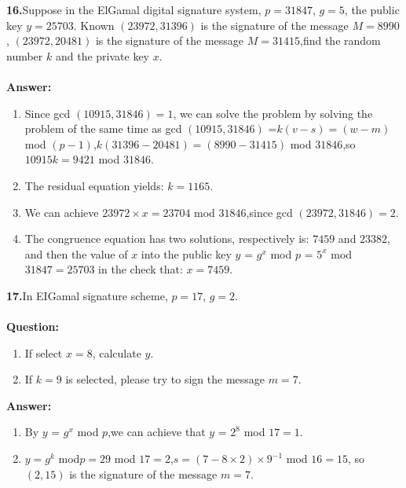\documentclass[paper=a4, fontsize=11pt]{scrartcl} %
\numberwithin{equation}{section} %
\numberwithin{figure}{section} %
\numberwithin{table}{section} %
\begin{document}
\textbf{16.}Suppose in the ElGamal digital signature system, $p = 31847$, $g = 5$, the public key $y = 25703$. Known $(23972,31396)$ is the signature of the message $M=8990$, $(23972,20481)$ is the signature of the message $M = 31415$,find the random number $k$ and the private key $x$.
\\
\\
\textbf{Answer:}
\begin{enumerate}
\item Since gcd $(10915, 31846) = 1$, we can solve the problem by solving the problem of the same time  as gcd $(10915, 31846)$ =$ k (v-s) = (w-m)$ mod $(p-1)$,$k (31396-20481) = (8990-31415)$ mod $31846$,so $10915k = 9421$ mod $31846$.
\item The residual equation yields: $k = 1165$.
\item We can achieve $23972 \times x = 23704$ mod $31846$,since gcd $(23972, 31846) = 2$.
\item The congruence equation has two solutions, respectively is: $7459$ and $23382$, and then the value of $x$ into the public key $y$ = $g^x$ mod $p$ = $5^x$ mod $31847 = 25703$ in the check that: $x = 7459$.
\end{enumerate}

\textbf{17.}In EIGamal signature scheme, $p = 17$, $g = 2$.
\\
\\
\textbf{Question:}
\begin{enumerate}
\item If select $x = 8$, calculate $y$.
\item If $k = 9$ is selected, please try to sign the message $m = 7$.
\end{enumerate}

\textbf{Answer:}
\begin{enumerate}
\item By $y$ = $g^x$ mod $p$,we can achieve that $y$ = $2^8$ mod $17 =1$.
\item $y = g^k$ mod$ p=29$ mod $17 = 2$,$s = (7-8 \times 2) \times 9^{-1}$ mod $16=15$, so $(2,15)$ is the signature of the message $m = 7$.
\end{enumerate}
\end{document}
